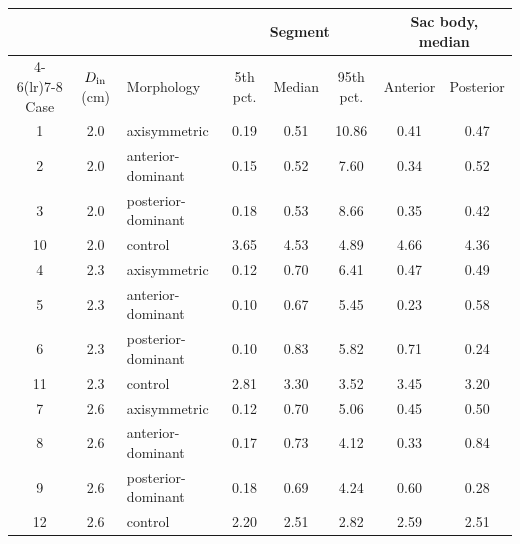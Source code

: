 \begin{table}[htbp]
\centering
\small
\caption{}
\label{tab:tawss}
\begin{tabular}{cclccccc}
\toprule
 & & & \multicolumn{3}{c}{Segment} & \multicolumn{2}{c}{Sac body, median} \\
\cmidrule(lr){4-6}\cmidrule(lr){7-8}
Case & $D_{\rm in}$ (cm) & Morphology & 5th pct. & Median & 95th pct. & Anterior & Posterior \\
\midrule
1 & 2.0 & axisymmetric & 0.19 & 0.51 & 10.86 & 0.41 & 0.47 \\
2 & 2.0 & anterior-dominant & 0.15 & 0.52 & 7.60 & 0.34 & 0.52 \\
3 & 2.0 & posterior-dominant & 0.18 & 0.53 & 8.66 & 0.35 & 0.42 \\
10 & 2.0 & control & 3.65 & 4.53 & 4.89 & 4.66 & 4.36 \\
4 & 2.3 & axisymmetric & 0.12 & 0.70 & 6.41 & 0.47 & 0.49 \\
5 & 2.3 & anterior-dominant & 0.10 & 0.67 & 5.45 & 0.23 & 0.58 \\
6 & 2.3 & posterior-dominant & 0.10 & 0.83 & 5.82 & 0.71 & 0.24 \\
11 & 2.3 & control & 2.81 & 3.30 & 3.52 & 3.45 & 3.20 \\
7 & 2.6 & axisymmetric & 0.12 & 0.70 & 5.06 & 0.45 & 0.50 \\
8 & 2.6 & anterior-dominant & 0.17 & 0.73 & 4.12 & 0.33 & 0.84 \\
9 & 2.6 & posterior-dominant & 0.18 & 0.69 & 4.24 & 0.60 & 0.28 \\
12 & 2.6 & control & 2.20 & 2.51 & 2.82 & 2.59 & 2.51 \\
\bottomrule
\end{tabular}
\end{table}
